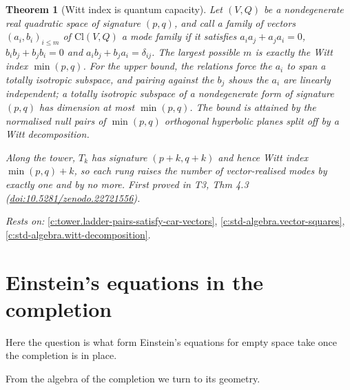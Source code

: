 \documentclass[11pt]{article}
\newtheorem{theorem}{Theorem}[section]
\theoremstyle{definition}
\theoremstyle{plain}
\providecommand{\Cl}{}\renewcommand{\Cl}{\mathrm{Cl}}
\begin{document}
\begin{theorem}[Witt index is quantum capacity]\label{c:tower.witt-index-quantum-capacity}
Let $(V, Q)$ be a nondegenerate real quadratic space of signature $(p,q)$, and call a family of vectors $(a_i, b_i)_{i \leq m}$ of $\Cl(V,Q)$ a mode family if it satisfies $a_i a_j + a_j a_i = 0$, $b_i b_j + b_j b_i = 0$ and $a_i b_j + b_j a_i = \delta_{ij}$. The largest possible $m$ is exactly the Witt index $\min(p,q)$. For the upper bound, the relations force the $a_i$ to span a totally isotropic subspace, and pairing against the $b_j$ shows the $a_i$ are linearly independent; a totally isotropic subspace of a nondegenerate form of signature $(p,q)$ has dimension at most $\min(p,q)$. The bound is attained by the normalised null pairs of $\min(p,q)$ orthogonal hyperbolic planes split off by a Witt decomposition.

Along the tower, $T_k$ has signature $(p{+}k, q{+}k)$ and hence Witt index $\min(p,q) + k$, so each rung raises the number of vector-realised modes by exactly one and by no more.
\emph{First proved in} T3, Thm 4.3 (\href{https://doi.org/10.5281/zenodo.22721556}{doi:10.5281/zenodo.22721556}).
\end{theorem}
\noindent\emph{Rests on:} \ref{c:tower.ladder-pairs-satisfy-car-vectors}, \ref{c:std-algebra.vector-squares}, \ref{c:std-algebra.witt-decomposition}.

\section{Einstein's equations in the completion}

Here the question is what form Einstein's equations for empty space take once the completion is in place.

From the algebra of the completion we turn to its geometry.
\end{document}
